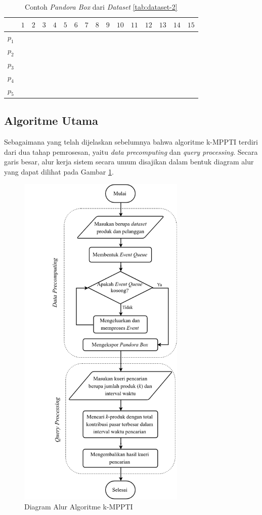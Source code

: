 \begin{table}[H]
	\small
	\centering
	\begin{tabular}{|C|C|C|C|C|C|C|C|C|C|C|C|C|C|C|C|}
		\hline
		& $1$ & $2$ & $3$ & $4$ & $5$ & $6$ & $7$ & $8$ & $9$ & $10$ & $11$ & $12$ & $13$ & $14$ & $15$ \\ \hline \hline
		$p_1$ & & & & & & & & & & & & & & & \\ \hline
		$p_2$ & & & & & & & & & & & & & & & \\ \hline
		$p_3$ & & & & & & & & & & & & & & & \\ \hline
		$p_4$ & & & & & & & & & & & & & & & \\ \hline
		$p_5$ & & & & & & & & & & & & & & & \\ \hline
	\end{tabular} 
	\caption{Contoh \textit{Pandora Box} dari \textit{Dataset} \ref{tab:dataset-2}}
	\label{tab:pbox}
\end{table}

\subsection{Algoritme Utama}
\tab Sebagaimana yang telah dijelaskan sebelumnya bahwa algoritme k-MPPTI terdiri dari dua tahap pemrosesan, yaitu \textit{data precomputing} dan \textit{query processing}. Secara garis besar, alur kerja sistem secara umum disajikan dalam bentuk diagram alur yang dapat dilihat pada Gambar \ref{fig:diagram-alur1}.

\begin{figure}[H]
	\centering
	\includegraphics[width=8cm]{assets/img/bab3/flowchart.png}
	\caption{Diagram Alur Algoritme k-MPPTI}
	\label{fig:diagram-alur1}
\end{figure}

